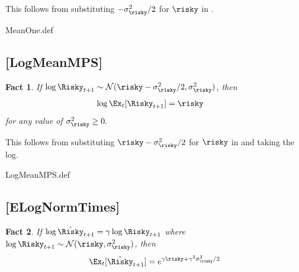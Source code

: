 \documentclass{handout}
\newtheorem{Fact}{Fact}
\begin{document}
This follows from substituting $- \sigma_{\risky}^{2}/2$ for $\risky$ in \ELogNorm.

\begin{verbatimwrite}{MeanOne.def}
\providecommand{\MeanOne}{\href{http://www.econ2.jhu.edu/people/ccarroll/public/LectureNotes/MathFacts/MathFactsList\#MeanOne}{\ensuremath{\mathtt{[MeanOne]}}}}
\end{verbatimwrite}

\hypertarget{LogMeanMPS}{}
\subsection{[LogMeanMPS]}

\begin{Fact} If $\log \Risky_{t+1} \sim \mathcal{N}(\null{\risky}-\sigma_{\risky}^{2}/2,\sigma_{\risky}^{2})$, then
\begin{equation}\begin{gathered}\begin{aligned}
      \log  \Ex_{t}[\Risky_{t+1}] & =  \risky
\end{aligned}\end{gathered}\end{equation}
for any value of $\sigma_{\risky}^{2} \geq 0.$
\end{Fact}

This follows from substituting $\risky - \sigma_{\risky}^{2}/2$ for $\risky$ in {\ELogNorm} and taking the log.

\begin{verbatimwrite}{LogMeanMPS.def}
\providecommand{\LogMeanMPS}{\href{http://www.econ2.jhu.edu/people/ccarroll/public/LectureNotes/MathFacts/MathFactsList\#LogMeanMPS}{\ensuremath{\mathtt{[LogMeanMPS]}}}}
\end{verbatimwrite}

\hypertarget{ELogNormTimes}{}
\subsection{[ELogNormTimes]}

\begin{Fact} If $\log \hat{\Risky}_{t+1} = \gamma \log \Risky_{t+1}$ where $\log \Risky_{t+1} \sim \mathcal{N}(\risky,\sigma_{\risky}^{2})$, then
\begin{equation}
        \Ex_{t}[\hat{\Risky}_{t+1}] = e^{\gamma \risky+\gamma^{2}\sigma_{\risky}^{2}/2} \label{eq:ELogNormTimes}
\end{equation}
\end{Fact}
\end{document}
